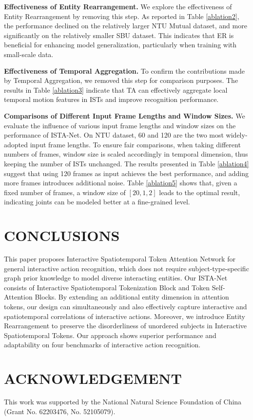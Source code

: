 \documentclass[letterpaper, 10 pt, conference]{ieeeconf}
\begin{document}
\textbf{Effectiveness of Entity Rearrangement.} We explore the effectiveness of Entity Rearrangement by removing this step. As reported in Table \ref{ablation2}, the performance declined on the relatively larger NTU Mutual dataset, and more significantly on the relatively smaller SBU dataset. This indicates that ER is beneficial for enhancing model generalization, particularly when training with small-scale data.

\textbf{Effectiveness of Temporal Aggregation.} To confirm the contributions made by Temporal Aggregation, we removed this step for comparison purposes. The results in Table \ref{ablation3} indicate that TA can effectively aggregate local temporal motion features in ISTs and improve recognition performance.

\textbf{Comparisons of Different Input Frame Lengths and Window Sizes.} We evaluate the influence of various input frame lengths and window sizes on the performance of ISTA-Net. On NTU dataset, 60 and 120 are the two most widely-adopted input frame lengths. To ensure fair comparisons, when taking different numbers of frames, window size is scaled accordingly in temporal dimension, thus keeping the number of ISTs unchanged. The results presented in Table \ref{ablation4} suggest that using 120 frames as input achieves the best performance, and adding more frames introduces additional noise. Table \ref{ablation5} shows that, given a fixed number of frames, a window size of $[20,1,2]$ leads to the optimal result, indicating joints can be modeled better at a fine-grained level.

\section{CONCLUSIONS}

This paper proposes Interactive Spatiotemporal Token Attention Network for general interactive action recognition, which does not require subject-type-specific graph prior knowledge to model diverse interacting entities. Our ISTA-Net consists of Interactive Spatiotemporal Tokenization Block and Token Self-Attention Blocks. By extending an additional entity dimension in attention tokens, our design can simultaneously and also effectively capture interactive and spatiotemporal correlations of interactive actions. Moreover, we introduce Entity Rearrangement to preserve the disorderliness of unordered subjects in Interactive Spatiotemporal Tokens. Our approach shows superior performance and adaptability on four benchmarks of interactive action recognition.

\section{ACKNOWLEDGEMENT}
This work was supported by the National Natural Science Foundation of China (Grant No. 62203476, No. 52105079).

\addtolength{\textheight}{-1.5cm}   






\normalem


\end{document}

